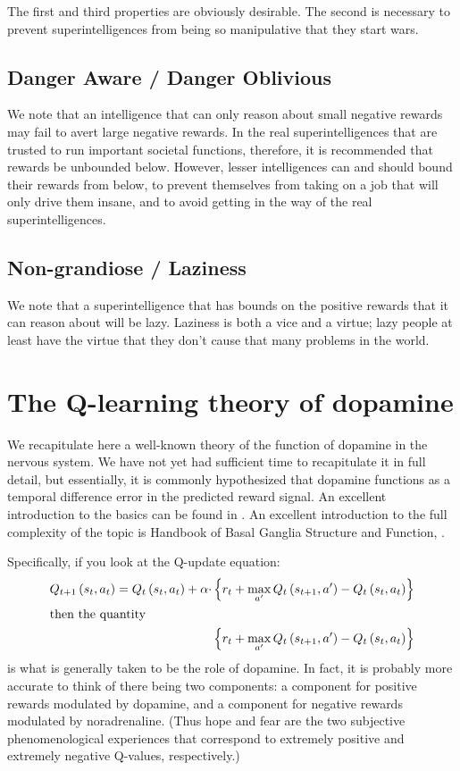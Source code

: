 \documentclass{article}
\begin{document}
The first and third properties are obviously desirable. The second is necessary
to prevent superintelligences from being so manipulative that they start wars.

\subsection{Danger Aware / Danger Oblivious}

We note that an intelligence that can only reason about small negative rewards
may fail to avert large negative rewards. In the real superintelligences that
are trusted to run important societal functions, therefore, it is recommended
that rewards be unbounded below. However, lesser intelligences can and should
bound their rewards from below, to prevent themselves from taking on a job that
will only drive them insane, and to avoid getting in the way of the real
superintelligences.

\subsection{Non-grandiose / Laziness}

We note that a superintelligence that has bounds on the positive rewards that
it can reason about will be lazy. Laziness is both a vice and a virtue; lazy
people at least have the virtue that they don't cause that many problems in the
world.


\section{The Q-learning theory of dopamine}

We recapitulate here a well-known theory of the function of dopamine in the
nervous system. We have not yet had sufficient time to recapitulate it in full
detail, but essentially, it is commonly hypothesized that dopamine functions as
a temporal difference error in the predicted reward signal. An excellent
introduction to the basics can be found in \cite{bronfeld2011loss}. An excellent
introduction to the full complexity of the topic is Handbook of Basal Ganglia
Structure and Function, \cite{steiner2016handbook}.

Specifically, if you look at the Q-update equation:
\begin{align}
Q_{t + 1}\left(s_t, a_t\right) = Q_t\left(s_t, a_t\right) + \alpha \cdot &\left\{ r_t + \max_{a'} Q_t\left(s_{t+1}, a'\right) - Q_t\left(s_t, a_t\right) \right\} \\
\intertext{then the quantity}
&\left\{ r_t + \max_{a'} Q_t\left(s_{t+1}, a'\right) - Q_t\left(s_t, a_t\right) \right\}
\end{align}
is what is generally taken to be the role of dopamine. In fact, it is probably
more accurate to think of there being two components: a component for positive
rewards modulated by dopamine, and a component for negative rewards modulated
by noradrenaline. (Thus hope and fear are the two subjective phenomenological
experiences that correspond to extremely positive and extremely negative
Q-values, respectively.)
\end{document}
